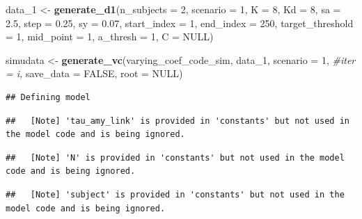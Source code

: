 \documentclass[
]{article}
\newenvironment{Shaded}{\begin{snugshade}}{\end{snugshade}}
\newcommand{\AttributeTok}[1]{\textcolor[rgb]{0.13,0.29,0.53}{#1}}
\newcommand{\CommentTok}[1]{\textcolor[rgb]{0.56,0.35,0.01}{\textit{#1}}}
\newcommand{\ConstantTok}[1]{\textcolor[rgb]{0.56,0.35,0.01}{#1}}
\newcommand{\DecValTok}[1]{\textcolor[rgb]{0.00,0.00,0.81}{#1}}
\newcommand{\FloatTok}[1]{\textcolor[rgb]{0.00,0.00,0.81}{#1}}
\newcommand{\FunctionTok}[1]{\textcolor[rgb]{0.13,0.29,0.53}{\textbf{#1}}}
\newcommand{\NormalTok}[1]{#1}
\newcommand{\OtherTok}[1]{\textcolor[rgb]{0.56,0.35,0.01}{#1}}
\begin{document}
\begin{Shaded}
\begin{Highlighting}[]
\NormalTok{data\_1 }\OtherTok{\textless{}{-}} \FunctionTok{generate\_d1}\NormalTok{(}\AttributeTok{n\_subjects =} \DecValTok{2}\NormalTok{,}
                          \AttributeTok{scenario =} \DecValTok{1}\NormalTok{,}
                          \AttributeTok{K =} \DecValTok{8}\NormalTok{, }
                          \AttributeTok{Kd =} \DecValTok{8}\NormalTok{,}
                          \AttributeTok{sa =} \FloatTok{2.5}\NormalTok{,}
                          \AttributeTok{step =} \FloatTok{0.25}\NormalTok{,}
                          \AttributeTok{sy =} \FloatTok{0.07}\NormalTok{,}
                          \AttributeTok{start\_index =} \DecValTok{1}\NormalTok{,}
                          \AttributeTok{end\_index =} \DecValTok{250}\NormalTok{,}
                          \AttributeTok{target\_threshold =} \DecValTok{1}\NormalTok{, }
                          \AttributeTok{mid\_point =} \DecValTok{1}\NormalTok{, }
                          \AttributeTok{a\_thresh =} \DecValTok{1}\NormalTok{,}
                          \AttributeTok{C =} \ConstantTok{NULL}\NormalTok{)}
    
\NormalTok{simudata }\OtherTok{\textless{}{-}} \FunctionTok{generate\_vc}\NormalTok{(varying\_coef\_code\_sim, data\_1, }
                            \AttributeTok{scenario =} \DecValTok{1}\NormalTok{, }\CommentTok{\#iter = i,}
                            \AttributeTok{save\_data =} \ConstantTok{FALSE}\NormalTok{, }\AttributeTok{root =} \ConstantTok{NULL}\NormalTok{)}
\end{Highlighting}
\end{Shaded}

\begin{verbatim}
## Defining model
\end{verbatim}

\begin{verbatim}
##   [Note] 'tau_amy_link' is provided in 'constants' but not used in the model code and is being ignored.
\end{verbatim}

\begin{verbatim}
##   [Note] 'N' is provided in 'constants' but not used in the model code and is being ignored.
\end{verbatim}

\begin{verbatim}
##   [Note] 'subject' is provided in 'constants' but not used in the model code and is being ignored.
\end{verbatim}
\end{document}
